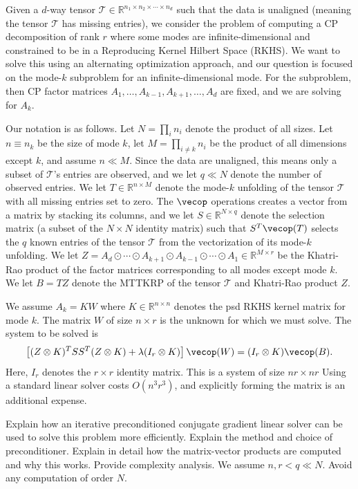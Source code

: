 Given a $d$-way tensor $\mathcal{T} \in \mathbb{R}^{n_1 \times n_2 \times \cdots \times n_d}$
such that the data is unaligned (meaning the tensor $\mathcal{T}$ has missing entries),
we consider the problem of computing a CP decomposition of rank $r$ where some modes are infinite-dimensional and constrained to be in a Reproducing Kernel Hilbert Space (RKHS).
We want to solve this using an alternating optimization approach, and our question is focused on the mode-$k$ subproblem for an infinite-dimensional mode.
For the subproblem, then CP factor matrices
$A_1, \dots, A_{k-1}, A_{k+1}, \dots, A_d$ are fixed, and we are solving for $A_k$.

Our notation is as follows.
Let $N = \prod_i n_i$ denote the product of all sizes.
Let $n \equiv n_k$ be the size of mode $k$, let
$M = \prod_{i\neq k} n_i$ be the product of all dimensions except $k$, and assume $n \ll M$.
Since the data are unaligned, this means only a subset of $\mathcal{T}$'s entries are observed, and we let $q \ll N$ denote the number of observed entries.
We let $T \in \mathbb{R}^{n \times M}$ denote the mode-$k$ unfolding of the tensor $\mathcal{T}$ with all missing entries set to zero.
The $\vecop$ operations creates a vector from a matrix by stacking its columns,
and we let $S \in \mathbb{R}^{N \times q}$ denote the selection matrix (a subset of the $N \times N$ identity matrix) such that $S^T \vecop(T)$ selects the $q$ known entries of the tensor $\mathcal{T}$ from the vectorization of its mode-$k$ unfolding.
We let $Z = A_d \odot \cdots \odot A_{k+1} \odot A_{k-1} \odot \cdots \odot A_1 \in \mathbb{R}^{M \times r}$ be the Khatri-Rao product of the factor matrices corresponding to all modes except mode $k$.
We let $B = TZ$ denote the MTTKRP of the tensor $\mathcal{T}$ and Khatri-Rao product $Z$.

We assume $A_k = KW$ where
$K \in \mathbb{R}^{n \times n}$ denotes the psd RKHS kernel matrix for mode $k$.
The matrix $W$ of size $n \times r$ is the unknown for which we must solve.
The system to be solved is
\begin{equation}
	\left[
    (Z \otimes K)^T S
    S^T (Z \otimes K)
    + \lambda (I_r \otimes K)
  \right] \vecop(W)
	= (I_r \otimes K)
	\vecop( B ). \nonumber
\end{equation}
Here, $I_r$ denotes the $r \times r$ identity matrix.
This is a system of size $nr \times nr$
Using a standard linear solver costs $O(n^3 r^3)$,
and explicitly forming the matrix is an additional expense.

Explain how an iterative preconditioned conjugate gradient linear solver can be used to solve this problem more efficiently. Explain the method and choice of preconditioner. Explain in detail how the matrix-vector products are computed and why this works. Provide complexity analysis.
We assume $n,r < q \ll N$. Avoid any computation of order $N$.
